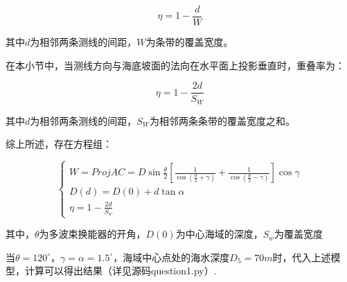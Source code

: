 \begin{equation}
    \eta = 1 - \frac{d}{W}
\end{equation}

其中$d$为相邻两条测线的间距，$W$为条带的覆盖宽度。

在本小节中，当测线方向与海底坡面的法向在水平面上投影垂直时，重叠率为：

\begin{equation}
    \eta = 1-\frac{2d}{S_W}
\end{equation}

其中$d$为相邻两条测线的间距，$S_W$为相邻两条条带的覆盖宽度之和。

综上所述，存在方程组：

\begin{equation}
    \begin{cases}
        W = Proj AC = D \sin\frac{\theta}{2}\left[
            \frac{1}{\cos(\frac{\theta}{2}+\gamma)} +
            \frac{1}{\cos(\frac{\theta}{2}-\gamma)}
        \right] \cos\gamma \\
        D(d) = D(0) + d\tan\alpha \\
        \eta = 1 - \frac{2d}{S_w}
    \end{cases}
\end{equation}

其中，$\theta$为多波束换能器的开角，$D(0)$为中心海域的深度，$S_w$为覆盖宽度

当$\theta = 120^\circ$，$\gamma=\alpha=1.5^\circ$，海域中心点处的海水深度$D_5 = 70m$时，代入上述模型，计算可以得出结果（详见源码question1.py）.

\begin{table}[h]
    \centering
    \caption{\textbf{问题1的计算结果(保留两位小数)}}
\end{table}


